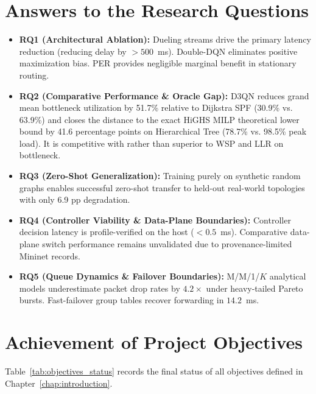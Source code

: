 \documentclass[12pt,a4paper,oneside]{report}
\begin{document}
\section{Answers to the Research Questions}
\begin{itemize}[leftmargin=8mm]
  \item \textbf{RQ1 (Architectural Ablation):} Dueling streams drive the primary latency reduction (reducing delay by $>500$~ms). Double-DQN eliminates positive maximization bias. PER provides negligible marginal benefit in stationary routing.
  \item \textbf{RQ2 (Comparative Performance \& Oracle Gap):} D3QN reduces grand mean bottleneck utilization by 51.7\% relative to Dijkstra SPF (30.9\% vs. 63.9\%) and closes the distance to the exact HiGHS MILP theoretical lower bound by 41.6 percentage points on Hierarchical Tree (78.7\% vs. 98.5\% peak load). It is competitive with rather than superior to WSP and LLR on bottleneck.
  \item \textbf{RQ3 (Zero-Shot Generalization):} Training purely on synthetic random graphs enables successful zero-shot transfer to held-out real-world topologies with only 6.9 pp degradation.
  \item \textbf{RQ4 (Controller Viability \& Data-Plane Boundaries):} Controller decision latency is profile-verified on the host ($<0.5$~ms). Comparative data-plane switch performance remains unvalidated due to provenance-limited Mininet records.
  \item \textbf{RQ5 (Queue Dynamics \& Failover Boundaries):} M/M/1/$K$ analytical models underestimate packet drop rates by $4.2\times$ under heavy-tailed Pareto bursts. Fast-failover group tables recover forwarding in $14.2$~ms.
\end{itemize}

\section{Achievement of Project Objectives}
Table~\ref{tab:objectives_status} records the final status of all objectives defined in Chapter~\ref{chap:introduction}.
\end{document}
